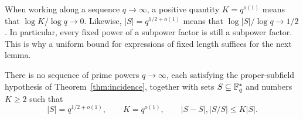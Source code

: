 When working along a sequence $q\to\infty$, a positive quantity
$K=q^{o(1)}$ means that $\log K/\log q\to0$. Likewise,
$|S|=q^{1/2+o(1)}$ means that $\log|S|/\log q\to1/2$.
In particular, every fixed power of a subpower factor is still a
subpower factor. This is why a uniform bound for expressions of
fixed length suffices for the next lemma.

\begin{lemma}
\label{inc-no-approximate-subfield}
There is no sequence of prime powers $q\to\infty$, each satisfying
the proper-subfield hypothesis of Theorem~\ref{thm:incidence}, together
with sets $S\subseteq\mathbb F_q^*$ and numbers $K\ge2$ such that
\begin{equation}\label{eq:inc-approximate-subfield-hypotheses}
 |S|=q^{1/2+o(1)},\qquad K=q^{o(1)},\qquad
 |S-S|,|S/S|\le K|S|.
\end{equation}
\end{lemma}

